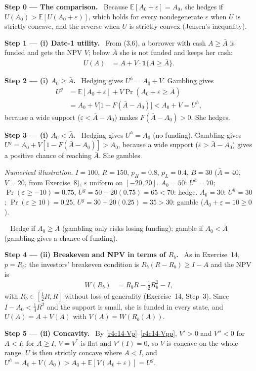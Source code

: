 \documentclass[11pt,a4paper]{article}
\newcommand{\step}[2]{\par\medskip\noindent\textbf{Step #1 --- #2.}~}
\newcommand{\answer}[1]{\par\smallskip\noindent\fbox{\textbf{Answer #1.}}~}
\begin{document}
\step{0}{The comparison} Because $\mathbb{E}[A_0+\varepsilon]=A_0$, she hedges if
$U(A_0)>\mathbb{E}[U(A_0+\varepsilon)]$, which holds for every nondegenerate $\varepsilon$ when $U$
is strictly concave, and the reverse when $U$ is strictly convex (Jensen's inequality).

\step{1}{(i) Date-1 utility} From (3.6), a borrower with cash $A\ge\bar A$ is funded and gets the
NPV $V$; below $\bar A$ she is not funded and keeps her cash:
\begin{align}
  U(A) &= A+V\cdot\mathbf 1\{A\ge\bar A\}. \nonumber
\end{align}

\step{2}{(i) $A_0\ge\bar A$} Hedging gives $U^h=A_0+V$. Gambling gives
\begin{align}
  U^g &= \mathbb{E}[A_0+\varepsilon]+V\Pr(A_0+\varepsilon\ge\bar A) \nonumber\\
      &= A_0+V\big[1-F(\bar A-A_0)\big] < A_0+V = U^h, \nonumber
\end{align}
because a wide support ($\underline\varepsilon<\bar A-A_0$) makes $F(\bar A-A_0)>0$. She hedges.

\step{3}{(i) $A_0<\bar A$} Hedging gives $U^h=A_0$ (no funding). Gambling gives
$U^g=A_0+V[1-F(\bar A-A_0)]>A_0$, because a wide support ($\bar\varepsilon>\bar A-A_0$) gives a
positive chance of reaching $\bar A$. She gambles.

\emph{Numerical illustration.} $I=100$, $R=150$, $p_H=0.8$, $p_L=0.4$, $B=30$ ($\bar A=40$,
$V=20$, from Exercise~8), $\varepsilon$ uniform on $[-20,20]$. $A_0=50$: $U^h=70$;
$\Pr(\varepsilon\ge-10)=0.75$, $U^g=50+20(0.75)=65<70$: hedge. $A_0=30$: $U^h=30$;
$\Pr(\varepsilon\ge10)=0.25$, $U^g=30+20(0.25)=35>30$: gamble ($A_0+\underline\varepsilon=10\ge0$).

\answer{(i)} Hedge if $A_0\ge\bar A$ (gambling only risks losing funding); gamble if
$A_0<\bar A$ (gambling gives a chance of funding).

\step{4}{(ii) Breakeven and NPV in terms of $R_b$} As in Exercise~14, $p=R_b$; the investors'
breakeven condition is $R_b(R-R_b)\ge I-A$ and the NPV is
\begin{align}
  W(R_b) &= R_bR-\tfrac12R_b^2-I, \nonumber
\end{align}
with $R_b\in[\tfrac12R,R]$ without loss of generality (Exercise~14, Step~3). Since
$I-A_0<\tfrac14R^2$ and the support is small, she is funded in every state, and
$U(A)=A+V(A)$ with $V(A)=W(R_b(A))$.

\step{5}{(ii) Concavity} By \eqref{r4e14-Vp}--\eqref{r4e14-Vpp}, $V'>0$ and $V''<0$ for $A<I$;
for $A\ge I$, $V=V^*$ is flat and $V'(I)=0$, so $V$ is concave on the whole range. $U$ is then
strictly concave where $A<I$, and $U^h=A_0+V(A_0)>A_0+\mathbb{E}[V(A_0+\varepsilon)]=U^g$.
\end{document}
